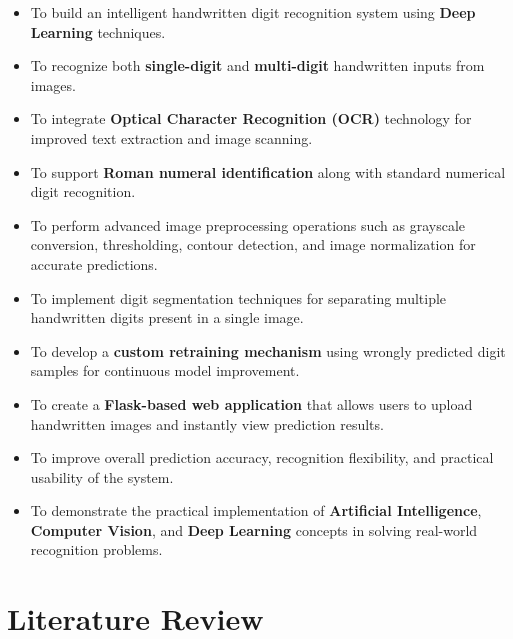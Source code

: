 \documentclass[12pt,a4paper]{article}
\begin{document}
\begin{itemize}

\item To build an intelligent handwritten digit recognition system using \textbf{Deep Learning} techniques.

\item To recognize both \textbf{single-digit} and \textbf{multi-digit} handwritten inputs from images.

\item To integrate \textbf{Optical Character Recognition (OCR)} technology for improved text extraction and image scanning.

\item To support \textbf{Roman numeral identification} along with standard numerical digit recognition.

\item To perform advanced image preprocessing operations such as grayscale conversion, thresholding, contour detection, and image normalization for accurate predictions.

\item To implement digit segmentation techniques for separating multiple handwritten digits present in a single image.

\item To develop a \textbf{custom retraining mechanism} using wrongly predicted digit samples for continuous model improvement.

\item To create a \textbf{Flask-based web application} that allows users to upload handwritten images and instantly view prediction results.

\item To improve overall prediction accuracy, recognition flexibility, and practical usability of the system.

\item To demonstrate the practical implementation of \textbf{Artificial Intelligence}, \textbf{Computer Vision}, and \textbf{Deep Learning} concepts in solving real-world recognition problems.

\end{itemize}

\newpage

\section{Literature Review}

\vspace{0.3cm}
\end{document}
